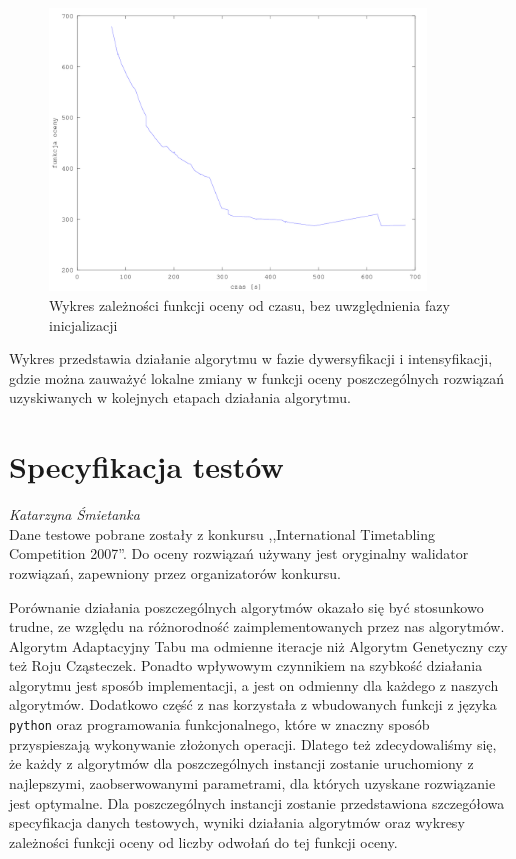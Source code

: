\begin{figure}[H]
  
  \centering
    \includegraphics[width=10cm]{szczegolowy2_instancja.png}
    \caption{Wykres zależności funkcji oceny od czasu, bez uwzględnienia fazy inicjalizacji}
\end{figure}
Wykres przedstawia działanie algorytmu w fazie dywersyfikacji i intensyfikacji, gdzie można zauważyć lokalne zmiany w funkcji oceny poszczególnych rozwiązań uzyskiwanych w kolejnych etapach działania algorytmu.
\section{Specyfikacja testów}
\textit{Katarzyna Śmietanka} 
\\
Dane testowe pobrane zostały z konkursu ,,International Timetabling Competition 2007''. Do oceny rozwiązań używany jest oryginalny walidator rozwiązań, zapewniony przez organizatorów konkursu.
\par Porównanie działania poszczególnych algorytmów okazało się być stosunkowo trudne, ze względu na różnorodność zaimplementowanych przez nas algorytmów. Algorytm Adaptacyjny Tabu ma odmienne iteracje niż Algorytm Genetyczny czy też Roju Cząsteczek. Ponadto wpływowym czynnikiem na szybkość działania algorytmu jest sposób implementacji, a jest on odmienny dla każdego z naszych algorytmów. Dodatkowo część z nas korzystała z wbudowanych funkcji z języka \verb#python# oraz programowania funkcjonalnego, które w znaczny sposób przyspieszają wykonywanie złożonych operacji. Dlatego też zdecydowaliśmy się, że każdy z algorytmów dla poszczególnych instancji zostanie uruchomiony z najlepszymi, zaobserwowanymi parametrami, dla których uzyskane rozwiązanie jest optymalne. Dla poszczególnych instancji zostanie przedstawiona szczegółowa specyfikacja danych testowych, wyniki działania algorytmów oraz wykresy zależności funkcji oceny od liczby odwołań do tej funkcji oceny.
